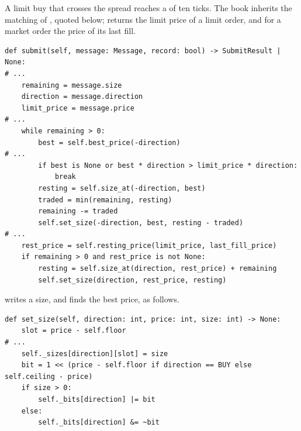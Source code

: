 \begin{question}
\label{question.tickArrayIntegersAfterACrossingBuy}
A limit buy that crosses the spread reaches a  of ten ticks.
The book inherits the matching of , quoted below;
 returns the limit price of a limit order,
and for a market order the price of its last fill.
\begin{lstlisting}[caption={\protect\codehl{unito26.lob.orderbook.AggregateBook.submit}, abridged.}, label=listing.tickArrayIntegersSubmit]
def submit(self, message: Message, record: bool) -> SubmitResult | None:
# ...
    remaining = message.size
    direction = message.direction
    limit_price = message.price
# ...
    while remaining > 0:
        best = self.best_price(-direction)
# ...
        if best is None or best * direction > limit_price * direction:
            break
        resting = self.size_at(-direction, best)
        traded = min(remaining, resting)
        remaining -= traded
        self.set_size(-direction, best, resting - traded)
# ...
    rest_price = self.resting_price(limit_price, last_fill_price)
    if remaining > 0 and rest_price is not None:
        resting = self.size_at(direction, rest_price) + remaining
        self.set_size(direction, rest_price, resting)
\end{lstlisting}
 writes a size, and finds the best price, as follows.
\begin{lstlisting}[caption={\protect\codehl{unito26.lob.orderbook.TickArrayBook}: a write, and the best price, abridged.}, label=listing.tickArrayIntegersWrite]
def set_size(self, direction: int, price: int, size: int) -> None:
    slot = price - self.floor
# ...
    self._sizes[direction][slot] = size
    bit = 1 << (price - self.floor if direction == BUY else self.ceiling - price)
    if size > 0:
        self._bits[direction] |= bit
    else:
        self._bits[direction] &= ~bit


\end{lstlisting}
\end{question}
